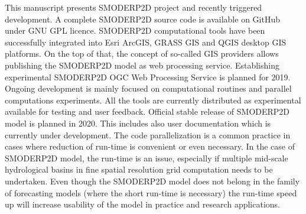 This manuscript presents SMODERP2D project and recently triggered 
development. A complete SMODERP2D source code is available on GitHub 
\cite{xxx} under GNU GPL licence. SMODERP2D computational tools have 
been successfully integrated into Esri ArcGIS, GRASS GIS and QGIS desktop GIS platforms. On the top of that, the concept of so-called GIS providers allows publishing the SMODERP2D model as web processing service. Establishing experimental SMODERP2D 
OGC Web Processing Service is planned for 2019. Ongoing development 
is mainly focused on computational routines and parallel computations experiments. All the tools are currently distributed as experimental available for testing and user feedback.
Official stable release of SMODERP2D model is planned in 2020. This 
includes also user documentation which is currently under development. 
The code parallelization is a common practice in cases where 
reduction of run-time is convenient or even necessary. In the 
case of SMODERP2D model, the run-time is an issue, especially 
if multiple mid-scale hydrological basins in fine spatial 
resolution grid computation needs to be undertaken. Even 
though the SMODERP2D model does not belong in the family of forecasting 
models (where the short run-time is necessary)  the run-time speed 
up will increase usability of the model in practice and research applications. 
